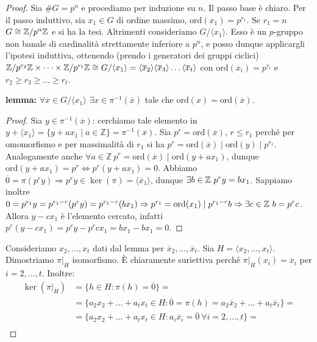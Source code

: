 \begin{proof}
    Sia $\#G = p^n$ e procediamo per induzione su $n$. Il passo base è chiaro.
    Per il passo induttivo, sia $ x_1 \in G$ di ordine massimo, $\text{ord}(x_1) = p^{r_1}$. Se $r_1 = n$ $G \cong \mathbb{Z}/p^n\mathbb{Z}$ e si ha la tesi. Altrimenti consideriamo $G/\langle x_1 \rangle$. Esso è un $p$-gruppo non banale di cardinalità strettamente inferiore a $p^n$, e posso dunque applicargli l'ipotesi induttiva, ottenendo (prendo i generatori dei gruppi ciclici) $\mathbb{Z}/p^{r_2}\mathbb{Z} \times \dots \times \mathbb{Z}/p^{r_t}\mathbb{Z} \cong G/\langle x_1 \rangle = \langle \overline x_2 \rangle \langle \overline x_3 \rangle \dots  \langle \overline x_t \rangle $ con $\text{ord}(\overline x_i) = p^{r_i}$ e $r_2 \geq r_3 \geq \dots \geq r_t$.

    \textbf{lemma:} $\forall \overline x \in G/\langle x_1 \rangle$ $\exists x \in \pi^{-1}(\overline x)$ tale che $\text{ord}(x) = \text{ord}(\overline x)$.
    \begin{proof}
        Sia $y \in \pi^{-1}(\overline x)$: cerchiamo tale elemento in $y + \langle x_1 \rangle = \{y + a x_1 \mid a \in \mathbb{Z}\} = \pi^{-1}(\overline x)$. Sia $p^r = \text{ord}(\overline x)$, $r \leq r_1$ perché per omomorfismo e per massimalità di $r_1$ si ha $p^r = \text{ord}(\overline x) \mid \text{ord}(y) \mid p^{r_1}$. Analogamente anche $\forall a \in \mathbb{Z} \ p^r = \text{ord}(\overline x) \mid \text{ord}(y + a x_1)$, dunque $\text{ord}(y + a x_1) = p^r \Leftrightarrow p^r(y + a x_1) = 0$. Abbiamo $\overline0 = \pi(p^r y) \Rightarrow p^r y \in \ker(\pi) = \langle \overline x_1 \rangle$, dunque $\exists b \in \mathbb{Z} \ p^ry = bx_1$. Sappiamo inoltre $0 = p^{r_1}y = p^{r_1-r}(p^r y) = p^{r_1-r}(b x_1) \Rightarrow p^{r_1} = \text{ord}(x_1) \mid p^{r_1-r}b \Rightarrow \exists c \in \mathbb{Z} \ b = p^rc$. Allora $y-cx_1$ è l'elemento cercato, infatti $p^r(y-cx_1) = p^ry - p^rcx_1 = b x_1 - bx_1 = 0$.
     \end{proof}
    Consideriamo $x_2, \dots, x_t$ dati dal lemma per $\overline x_2, \dots , \overline x_t$. Sia $H = \langle x_2,\dots, x_t \rangle$. Dimostriamo $\pi|_H$ isomorfismo. È chiaramente suriettiva perché $\pi|_H(x_i) = \overline x_i$ per $i=2,\dots,t$. Inoltre:
    \begin{align}
    \ker(\pi|_H) & = \{h \in H : \pi(h) =\overline 0 \} =  \nonumber \\
    & = \{a_2 x_2+\dots+a_t x_t \in H :  \overline 0 = \pi(h) = a_2\overline x_2+\dots+a_t\overline x_t \}  =  \nonumber \\
    & =  \{a_2 x_2+\dots+a_t x_t \in H : a_i\overline x_i = \overline 0 \ \forall i = 2,\dots, t\}  = \nonumber \\

\end{align}
\end{proof}
